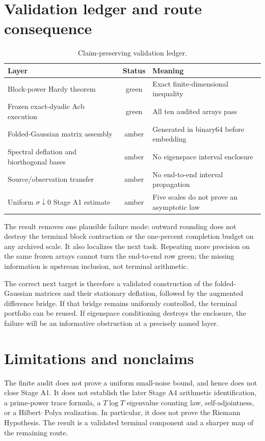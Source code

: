 \documentclass[11pt]{article}
\theoremstyle{definition}
\begin{document}
\section{Validation ledger and route consequence}
\label{sec:ledger}

\begin{table}[H]
\centering
\caption{Claim-preserving validation ledger.}
\label{tab:ledger}
\begin{tabular}{L{0.38\textwidth}cL{0.40\textwidth}}
\toprule
Layer & Status & Meaning\\
\midrule
Block-power Hardy theorem & green & Exact finite-dimensional inequality\\
Frozen exact-dyadic Acb execution & green & All ten audited arrays pass\\
Folded-Gaussian matrix assembly & amber & Generated in binary64 before embedding\\
Spectral deflation and biorthogonal bases & amber & No eigenspace interval enclosure\\
Source/observation transfer & amber & No end-to-end interval propagation\\
Uniform $\sigma\downarrow0$ Stage A1 estimate & amber & Five scales do not prove an asymptotic law\\
\bottomrule
\end{tabular}
\end{table}

The result removes one plausible failure mode: outward rounding does not
destroy the terminal block contraction or the one-percent completion budget
on any archived scale.  It also localizes the next task.  Repeating more
precision on the same frozen arrays cannot turn the end-to-end row green;
the missing information is upstream inclusion, not terminal arithmetic.

The correct next target is therefore a validated construction of the
folded-Gaussian matrices and their stationary deflation, followed by the
augmented difference bridge.  If that bridge remains uniformly controlled,
the terminal portfolio can be reused.  If eigenspace conditioning destroys
the enclosure, the failure will be an informative obstruction at a precisely
named layer.

\section{Limitations and nonclaims}

The finite audit does not prove a uniform small-noise bound, and hence does
not close Stage A1.  It does not establish the later Stage A4 arithmetic
identification, a prime-power trace formula, a $T\log T$ eigenvalue counting
law, self-adjointness, or a Hilbert--Polya realization.  In particular, it
does not prove the Riemann Hypothesis.  The result is a validated terminal
component and a sharper map of the remaining route.
\end{document}
